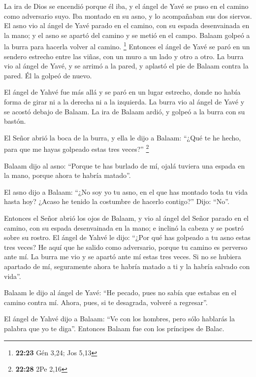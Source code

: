  La ira de Dios se encendió porque él iba, y el ángel de
Yavé se puso en el camino como adversario suyo. Iba montado en su asno,
y lo acompañaban sus dos siervos.  El asno vio al ángel
de Yavé parado en el camino, con su espada desenvainada en la mano; y el
asno se apartó del camino y se metió en el campo. Balaam golpeó a la
burra para hacerla volver al camino. \footnote{\textbf{22:23} Gén 3,24;
  Jos 5,13}  Entonces el ángel de Yavé se paró en un
sendero estrecho entre las viñas, con un muro a un lado y otro a otro.
 La burra vio al ángel de Yavé, y se arrimó a la pared, y
aplastó el pie de Balaam contra la pared. Él la golpeó de nuevo.

 El ángel de Yahvé fue más allá y se paró en un lugar
estrecho, donde no había forma de girar ni a la derecha ni a la
izquierda.  La burra vio al ángel de Yavé y se acostó
debajo de Balaam. La ira de Balaam ardió, y golpeó a la burra con su
bastón.

 El Señor abrió la boca de la burra, y ella le dijo a
Balaam: ``¿Qué te he hecho, para que me hayas golpeado estas tres
veces?'' \footnote{\textbf{22:28} 2Pe 2,16}

 Balaam dijo al asno: ``Porque te has burlado de mí,
ojalá tuviera una espada en la mano, porque ahora te habría matado''.

 El asno dijo a Balaam: ``¿No soy yo tu asno, en el que
has montado toda tu vida hasta hoy? ¿Acaso he tenido la costumbre de
hacerlo contigo?'' Dijo: ``No''.

 Entonces el Señor abrió los ojos de Balaam, y vio al
ángel del Señor parado en el camino, con su espada desenvainada en la
mano; e inclinó la cabeza y se postró sobre su rostro. 
El ángel de Yahvé le dijo: ``¿Por qué has golpeado a tu asno estas tres
veces? He aquí que he salido como adversario, porque tu camino es
perverso ante mí.  La burra me vio y se apartó ante mí
estas tres veces. Si no se hubiera apartado de mí, seguramente ahora te
habría matado a ti y la habría salvado con vida''.

 Balaam le dijo al ángel de Yavé: ``He pecado, pues no
sabía que estabas en el camino contra mí. Ahora, pues, si te desagrada,
volveré a regresar''.

 El ángel de Yahvé dijo a Balaam: ``Ve con los hombres,
pero sólo hablarás la palabra que yo te diga''. Entonces Balaam fue con
los príncipes de Balac.

